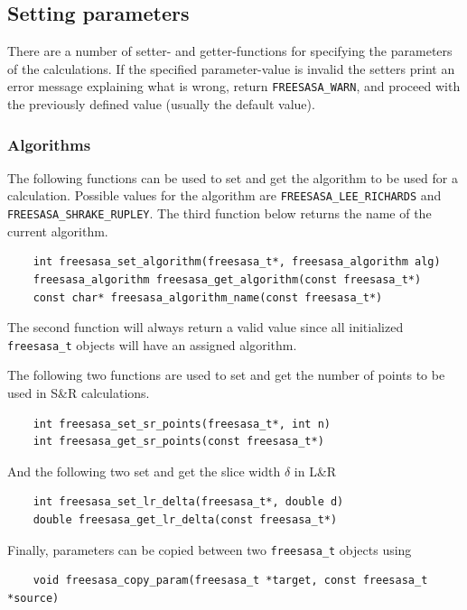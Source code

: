 \documentclass[a4paper,11pt]{article}
\begin{document}
\subsection{Setting parameters}

There are a number of setter- and getter-functions for specifying the
parameters of the calculations. If the specified parameter-value is
invalid the setters print an error message explaining what is wrong,
return \verb|FREESASA_WARN|, and proceed with the previously defined
value (usually the default value).

\subsubsection{Algorithms}

The following functions can be used to set and get the algorithm to be
used for a calculation. Possible values for the algorithm are
\verb|FREESASA_LEE_RICHARDS| and \verb|FREESASA_SHRAKE_RUPLEY|.  The
third function below returns the name of
the current algorithm.
\begin{verbatim}
    int freesasa_set_algorithm(freesasa_t*, freesasa_algorithm alg)
    freesasa_algorithm freesasa_get_algorithm(const freesasa_t*)
    const char* freesasa_algorithm_name(const freesasa_t*)
\end{verbatim}
The second function will always return a valid value since all
initialized \verb|freesasa_t| objects will have an assigned algorithm.

The following two functions are used to set and get the number of
points to be used in S\&R calculations. 
\begin{verbatim}
    int freesasa_set_sr_points(freesasa_t*, int n)
    int freesasa_get_sr_points(const freesasa_t*)
\end{verbatim}
And the following two set and get the slice width $\delta$ in L\&R
\begin{verbatim}
    int freesasa_set_lr_delta(freesasa_t*, double d) 
    double freesasa_get_lr_delta(const freesasa_t*)
\end{verbatim}
Finally, parameters can be copied between two \verb|freesasa_t| objects
using
\begin{verbatim}
    void freesasa_copy_param(freesasa_t *target, const freesasa_t *source)
\end{verbatim}
\end{document}
